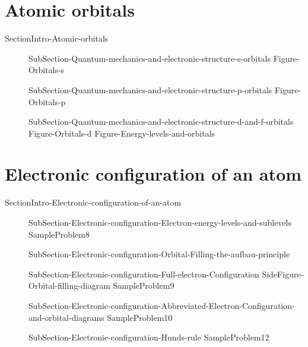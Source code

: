 \documentclass[main.tex]{subfiles}
\begin{document}
{ 

 

\section{Atomic orbitals}{SectionIntro-Atomic-orbitals} 
\sloppy\begin{description}
\item[] {SubSection-Quantum-mechanics-and-electronic-structure-s-orbitals} 
 {Figure-Orbitals-s}
\item[] {SubSection-Quantum-mechanics-and-electronic-structure-p-orbitals}
 {Figure-Orbitals-p}
\item[] {SubSection-Quantum-mechanics-and-electronic-structure-d-and-f-orbitals}
{Figure-Orbitals-d}
 {Figure-Energy-levels-and-orbitals}
\end{description}



\section{Electronic configuration of an atom}{SectionIntro-Electronic-configuration-of-an-atom}
\sloppy\begin{description}
\item[] {SubSection-Electronic-configuration-Electron-energy-levels-and-sublevels}
{SampleProblem8}
     \label{Fig:{\chapterlabel}\thefigurenewcounter} 
\item[]{SubSection-Electronic-configuration-Orbital-Filling-the-aufbau-principle}
\item[] {SubSection-Electronic-configuration-Full-electron-Configuration}
{SideFigure-Orbital-filling-diagram}
{SampleProblem9}
\item[] {SubSection-Electronic-configuration-Abbreviated-Electron-Configuration-and-orbital-diagrams}
{SampleProblem10}
\item[] {SubSection-Electronic-configuration-Hunds-rule}
{SampleProblem12}
\end{description}


}
\end{document}
